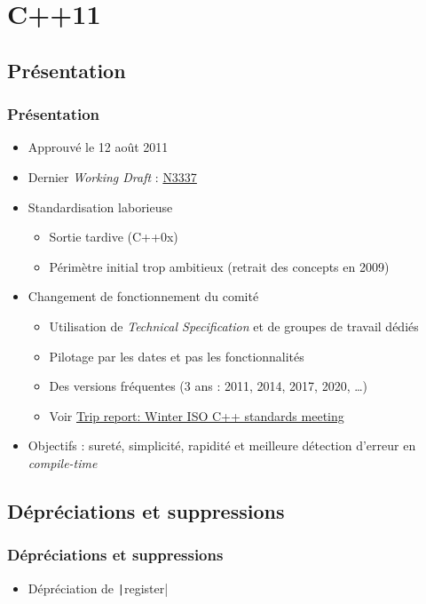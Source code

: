 \documentclass[C++.tex]{subfiles}
\begin{document}
\section{C++11}
\subsection*{Présentation}
\begin{frame}
	\frametitle{Présentation}
	\begin{itemize}
		\item Approuvé le 12 août 2011
		\item Dernier \textit{Working Draft} : \href{http://www.open-std.org/jtc1/sc22/wg21/docs/papers/2012/n3337.pdf}{N3337}
		\item Standardisation laborieuse
		\begin{itemize}
			\item Sortie tardive (C++0x)
			\item Périmètre initial trop ambitieux (retrait des concepts en 2009)
		\end{itemize}
		\item Changement de fonctionnement du comité
		\begin{itemize}
			\item Utilisation de \textit{Technical Specification} et de groupes de travail dédiés
			\item Pilotage par les dates et pas les fonctionnalités
			\item Des versions fréquentes (3 ans : 2011, 2014, 2017, 2020, \ldots{})
			\item Voir \href{https://herbsutter.com/2016/03/11/trip-report-winter-iso-c-standards-meeting/}{Trip report: Winter ISO C++ standards meeting}
		\end{itemize}
		\item Objectifs : sureté, simplicité, rapidité et meilleure détection d'erreur en \textit{compile-time}

	\end{itemize}
\end{frame}

\subsection*{Dépréciations et suppressions}
\begin{frame}[fragile]
	\frametitle{Dépréciations et suppressions}
	\begin{itemize}
		\item Dépréciation de \texttt|register|

	\end{itemize}
\end{frame}
\end{document}
